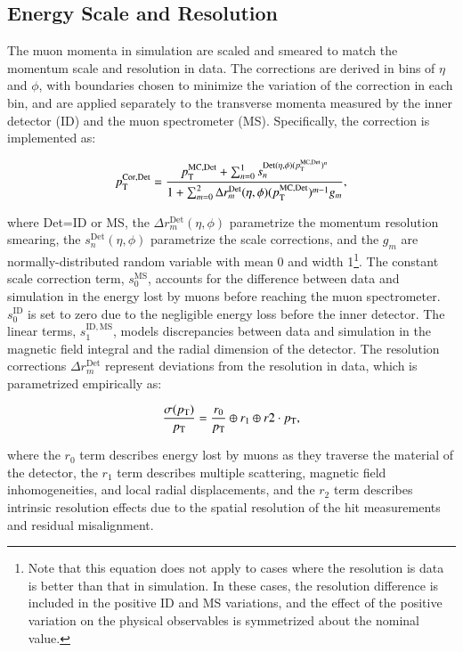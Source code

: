 \subsection{Energy Scale and Resolution}\label{sec:reco-muon-energymomentum}
The muon momenta in simulation are scaled and smeared to match the momentum scale and resolution in data. The corrections are derived in bins of $\eta$ and $\phi$, with boundaries chosen to minimize the variation of the correction in each bin, and are applied separately to the transverse momenta measured by the inner detector (ID) and the muon spectrometer (MS). Specifically, the correction is implemented as:

\begin{equation}
	\pt^{\mathrm{Cor,Det}} = \frac{\pt^{\mathrm{MC,Det}} + \sum_{n=0}^1 s_n^{\mathrm{Det}(\eta,\phi)(\pt^{\mathrm{MC,Det}})^n}}{1+\sum_{m=0}^2 \Delta r_m^{\mathrm{Det}}(\eta,\phi)(\pt^{\mathrm{MC,Det}})^{m-1}g_m},
\end{equation}

where Det=ID or MS, the $\Delta r_m^{\mathrm{Det}}(\eta,\phi)$ parametrize the momentum resolution smearing, the $s_n^{\mathrm{Det}}(\eta,\phi)$ parametrize the scale corrections, and the $g_m$ are normally-distributed random variable with mean 0 and width 1\footnote{Note that this equation does not apply to cases where the resolution is data is better than that in simulation. In these cases, the resolution difference is included in the positive ID and MS variations, and the effect of the positive variation on the physical observables is symmetrized about the nominal value.}. The constant scale correction term, $s_0^{\mathrm{MS}}$, accounts for the difference between data and simulation in the energy lost by muons before reaching the muon spectrometer. $s_0^{\mathrm{ID}}$ is set to zero due to the negligible energy loss before the inner detector. The linear terms, $s_1^{\mathrm{ID,MS}}$, models discrepancies between data and simulation in the magnetic field integral and the radial dimension of the detector. The resolution corrections $\Delta r_m^{\mathrm{Det}}$ represent deviations from the resolution in data, which is parametrized empirically as:

\begin{equation}
	\frac{\sigma(p_{\text{T}})}{p_{\text{T}}} = \frac{r_0}{p_{\text{T}}} \oplus r_1 \oplus r2\cdot p_{\text{T}},
\end{equation}

where the $r_0$ term describes energy lost by muons as they traverse the material of the detector, the $r_1$ term describes multiple scattering, magnetic field inhomogeneities, and local radial displacements, and the $r_2$ term describes intrinsic resolution effects due to the spatial resolution of the hit measurements and residual misalignment. 

